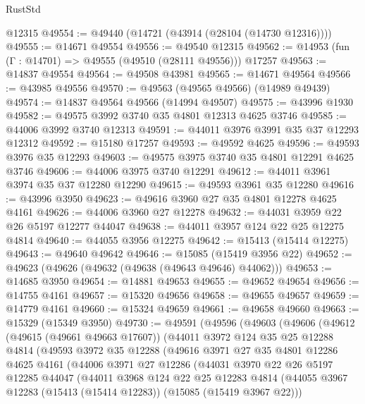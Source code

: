 \begin{lexlean}{RustStd}
\begin{coremodule}
    @12315
@49554 := @49440 (@14721 (@43914 (@28104 (@14730 @12316))))
@49555 := @14671 @49554
@49556 := @49540 @12315
@49562 := @14953 (fun (Γ : @14701) => @49555 (@49510 (@28111 @49556))) @17257
@49563 := @14837 @49554
@49564 := @49508 @43981
@49565 := @14671 @49564
@49566 := @43985 @49556
@49570 := @49563 (@49565 @49566) (@14989 @49439)
@49574 := @14837 @49564 @49566 (@14994 @49507)
@49575 := @43996 @1930
@49582 := @49575 @3992 @3740 @35 @4801 @12313 @4625 @3746
@49585 := @44006 @3992 @3740 @12313
@49591 := @44011 @3976 @3991 @35 @37 @12293 @12312
@49592 := @15180 @17257
@49593 := @49592 @4625
@49596 := @49593 @3976 @35 @12293
@49603 := @49575 @3975 @3740 @35 @4801 @12291 @4625 @3746
@49606 := @44006 @3975 @3740 @12291
@49612 := @44011 @3961 @3974 @35 @37 @12280 @12290
@49615 := @49593 @3961 @35 @12280
@49616 := @43996 @3950
@49623 := @49616 @3960 @27 @35 @4801 @12278 @4625 @4161
@49626 := @44006 @3960 @27 @12278
@49632 := @44031 @3959 @22 @26 @5197 @12277 @44047
@49638 := @44011 @3957 @124 @22 @25 @12275 @4814
@49640 := @44055 @3956 @12275
@49642 := @15413 (@15414 @12275)
@49643 := @49640 @49642
@49646 := @15085 (@15419 @3956 @22)
@49652 := @49623 (@49626 (@49632 (@49638 (@49643 @49646) @44062)))
@49653 := @14685 @3950
@49654 := @14881 @49653
@49655 := @49652 @49654
@49656 := @14755 @4161
@49657 := @15320 @49656
@49658 := @49655 @49657
@49659 := @14779 @4161
@49660 := @15324 @49659
@49661 := @49658 @49660
@49663 := @15329 (@15349 @3950)
@49730 := @49591
    (@49596
      (@49603
        (@49606
          (@49612
            (@49615 (@49661 @49663 @17607))
            (@44011
              @3972
              @124
              @35
              @25
              @12288
              @4814
              (@49593
                @3972
                @35
                @12288
                (@49616
                  @3971
                  @27
                  @35
                  @4801
                  @12286
                  @4625
                  @4161
                  (@44006
                    @3971
                    @27
                    @12286
                    (@44031
                      @3970
                      @22
                      @26
                      @5197
                      @12285
                      @44047
                      (@44011
                        @3968
                        @124
                        @22
                        @25
                        @12283
                        @4814
                        (@44055 @3967 @12283 (@15413 (@15414 @12283)) (@15085 (@15419 @3967 @22)))

\end{coremodule}
\end{lexlean}
